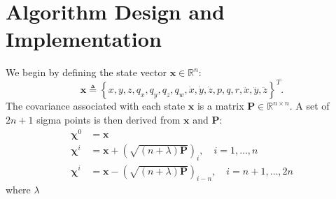 \chapter{Algorithm Design and Implementation} \label{ch:alg_design}

We begin by defining the state vector $\mathbf{x} \in \mathbb{R}^{n}$:
%
\begin{equation}
\mathbf{x} \triangleq \left\lbrace
x,
y,
z,
q_{x},
q_{y},
q_{z},
q_{w},
\dot{x},
\dot{y},
\dot{z},
p,
q,
r,
\ddot{x},
\ddot{y},
\ddot{z}
\right\rbrace ^{T}.
\end{equation}
%
The covariance associated with each state $\mathbf{x}$ is a matrix $\mathbf{P} \in \mathbb{R}^{n \times n}$. A set of $2n + 1$ sigma points is then derived from $\mathbf{x}$ and $\mathbf{P}$:
%
\begin{align}
\mathbf{\chi}^{0} &= \mathbf{x} \nonumber\\
\mathbf{\chi}^{i} &= \mathbf{x} + \left( \sqrt{\left( n + \lambda \right) \mathbf{P} } \right)_{i}, \quad i = 1, \dots, n \\
\mathbf{\chi}^{i} &= \mathbf{x} - \left( \sqrt{\left( n + \lambda \right) \mathbf{P} } \right)_{i-n}, \quad i = n+1, \dots, 2n \nonumber
\end{align}
%
where $\lambda$